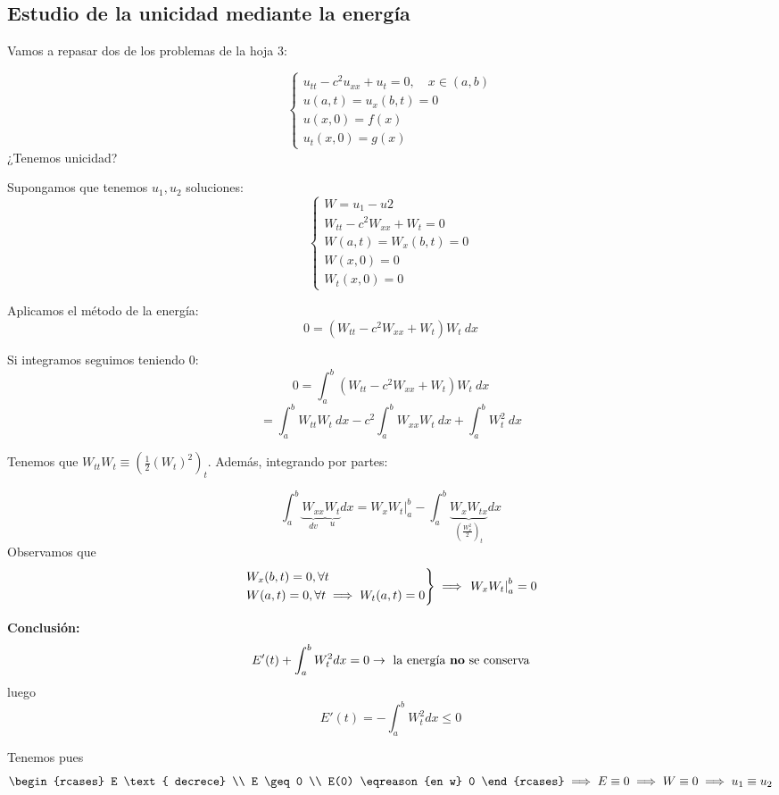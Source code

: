 
		\subsection{Estudio de la unicidad mediante la energía}

			Vamos a repasar dos de los problemas de la hoja 3:
			\begin{problem}
				\[\begin{cases}
					u_{tt} - c^2u_{xx} + u_t = 0, \quad x \in (a,b)\\
					u(a,t) = u_x (b,t) = 0\\
					u(x,0) = f(x) \\
					u_t(x,0) = g(x)
				\end{cases}\]
				¿Tenemos unicidad?

				\solution

				Supongamos que tenemos $u_1,u_2$ soluciones:
				\[ \begin{cases} W = u_1 - u2 \\
				W_{tt} - c^2 W_{xx} + W_t = 0 \\
				W(a,t) = W_x (b,t) = 0\\
				W(x,0) = 0\\
				W_t (x,0) = 0
				\end{cases}\]

				Aplicamos el método de la energía:
				\[ 0 = (W_{tt} - c^2 W_{xx} + W_t) W_t\ dx\]

				Si integramos seguimos teniendo 0:
				\[ 0 = \int_a^b (W_{tt} - c^2 W_{xx} + W_t) W_t\ dx\]
				\[ = \int_a^b W_{tt} W_t\ dx - c^2 \int^b_a W_{xx} W_t\ dx + \int_{a}^b W^2_t\ dx  \]

				Tenemos que $W_{tt}W_t \equiv (\frac{1}{2} (W_t)^2)_t $. Además, integrando por partes:

				\[ \int_a^b \underbrace{W_{xx}}_{dv} \underbrace{W_t}_{u} dx = \left. W_x W_t \right|_a^b - \int_a^b \underbrace{W_x W_{tx}}_{(\frac{W_x^2}{2})_t} dx \]
				Observamos que
				\[
				\begin{rcases}
						W_x (b,t) = 0, \forall t\\
						W(a,t) = 0, \forall t \implies W_t (a,t) = 0
				\end{rcases}
				\implies \left. W_x W_t \right|_a^b = 0
				\]

				{\bf Conclusión:}
				\[ E'(t) + \int_a^b W_t^2 dx = 0 \rightarrow \text{ la energía {\bf no} se conserva}\]
				luego
				\[ E'(t) = -\int_a^b W_t^2 dx \leq 0 \]

				Tenemos pues
				\[
					\begin{rcases}
						E \text{ decrece} \\
						E \geq 0 \\
						E(0) \eqreason{en w} 0
					\end{rcases} \implies E \equiv 0 \implies W \equiv 0 \implies u_1 \equiv u_2
				\]

			\end{problem}

